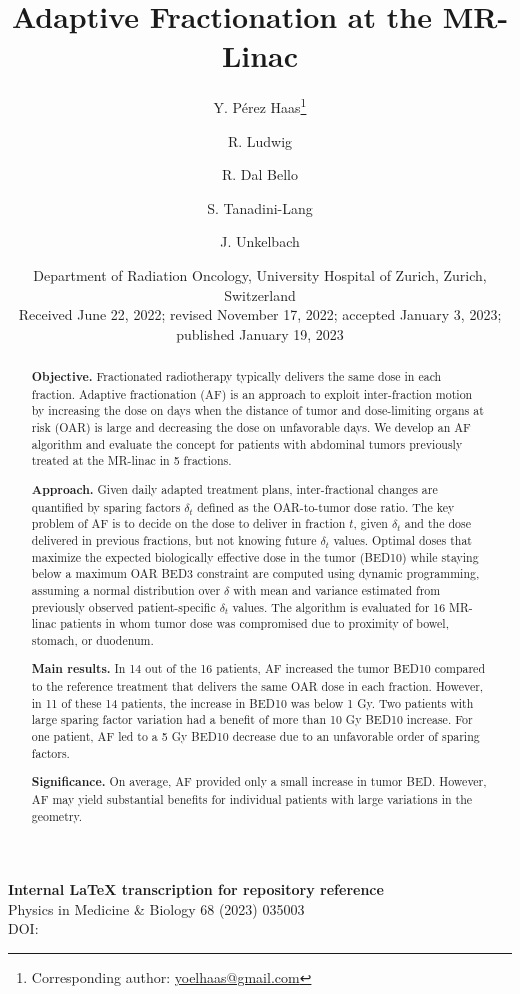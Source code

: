 \documentclass[11pt]{article}
\title{Adaptive Fractionation at the MR-Linac}
\author{
  Y. P\'erez Haas\thanks{Corresponding author: \href{mailto:yoelhaas@gmail.com}{yoelhaas@gmail.com}} \and
  R. Ludwig \and
  R. Dal Bello \and
  S. Tanadini-Lang \and
  J. Unkelbach
}
\date{
  Department of Radiation Oncology, University Hospital of Zurich, Zurich, Switzerland\\
  \vspace{0.5em}
  Received June 22, 2022; revised November 17, 2022; accepted January 3, 2023; published January 19, 2023
}
\newcommand{\href}[2]{\texttt{\detokenize{#2}}}
\begin{document}
\maketitle

\begin{center}
\textbf{Internal LaTeX transcription for repository reference}\\
Physics in Medicine \& Biology 68 (2023) 035003\\
DOI: \href{https://doi.org/10.1088/1361-6560/acafd4}{10.1088/1361-6560/acafd4}
\end{center}

\begin{abstract}
\textbf{Objective.}
Fractionated radiotherapy typically delivers the same dose in each fraction. Adaptive fractionation (AF) is an approach to exploit inter-fraction motion by increasing the dose on days when the distance of tumor and dose-limiting organs at risk (OAR) is large and decreasing the dose on unfavorable days. We develop an AF algorithm and evaluate the concept for patients with abdominal tumors previously treated at the MR-linac in 5 fractions.

\textbf{Approach.}
Given daily adapted treatment plans, inter-fractional changes are quantified by sparing factors $\delta_t$ defined as the OAR-to-tumor dose ratio. The key problem of AF is to decide on the dose to deliver in fraction $t$, given $\delta_t$ and the dose delivered in previous fractions, but not knowing future $\delta_t$ values. Optimal doses that maximize the expected biologically effective dose in the tumor (BED10) while staying below a maximum OAR BED3 constraint are computed using dynamic programming, assuming a normal distribution over $\delta$ with mean and variance estimated from previously observed patient-specific $\delta_t$ values. The algorithm is evaluated for 16 MR-linac patients in whom tumor dose was compromised due to proximity of bowel, stomach, or duodenum.

\textbf{Main results.}
In 14 out of the 16 patients, AF increased the tumor BED10 compared to the reference treatment that delivers the same OAR dose in each fraction. However, in 11 of these 14 patients, the increase in BED10 was below 1 Gy. Two patients with large sparing factor variation had a benefit of more than 10 Gy BED10 increase. For one patient, AF led to a 5 Gy BED10 decrease due to an unfavorable order of sparing factors.

\textbf{Significance.}
On average, AF provided only a small increase in tumor BED. However, AF may yield substantial benefits for individual patients with large variations in the geometry.
\end{abstract}
\end{document}
